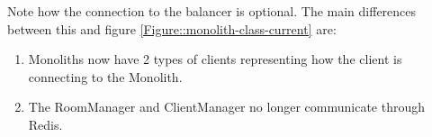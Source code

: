 Note how the connection to the balancer is optional. The main differences between this and figure \ref{Figure::monolith-class-current} are:
\begin{enumerate}
  \item Monoliths now have 2 types of clients representing how the client is connecting to the Monolith.
  \item The RoomManager and ClientManager no longer communicate through Redis.
\end{enumerate}
